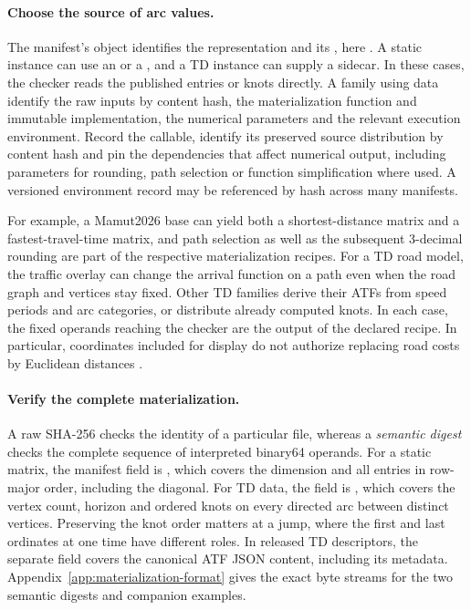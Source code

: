 \paragraph{Choose the source of arc values.}
The manifest's  object identifies the representation and its , here . A static instance can use an  or a , and a TD instance can supply a  sidecar. In these cases, the checker reads the published entries or knots directly. A family using  data \must{} identify the raw inputs by content hash, the materialization function and immutable implementation, the numerical parameters and the relevant execution environment. Record the callable, identify its preserved source distribution by content hash and pin the dependencies that affect numerical output, including parameters for rounding, path selection or function simplification where used. A versioned environment record may be referenced by hash across many manifests.

For example, a Mamut2026 base can yield both a shortest-distance matrix and a fastest-travel-time matrix, and path selection as well as the subsequent 3-decimal rounding are part of the respective materialization recipes. For a TD road model, the traffic overlay can change the arrival function on a path even when the road graph and vertices stay fixed. Other TD families derive their ATFs from speed periods and arc categories, or distribute already computed knots. In each case, the fixed operands reaching the checker are the output of the declared recipe. In particular, coordinates included for display do not authorize replacing road costs by Euclidean distances \autocite{pichonMamut2026,pichonPoryos2026}.

\paragraph{Verify the complete materialization.}
A raw SHA-256 checks the identity of a particular file, whereas a \emph{semantic digest} checks the complete sequence of interpreted binary64 operands. For a static matrix, the manifest field is , which covers the dimension and all entries in row-major order, including the diagonal. For TD data, the field is , which covers the vertex count, horizon and ordered knots on every directed arc between distinct vertices. Preserving the knot order matters at a jump, where the first and last ordinates at one time have different roles. In released TD descriptors, the separate field  covers the canonical ATF JSON content, including its metadata. Appendix~\ref{app:materialization-format} gives the exact byte streams for the two semantic digests and companion examples.

